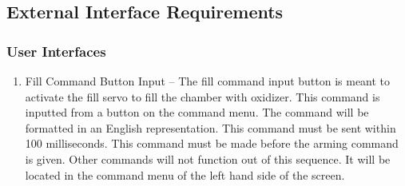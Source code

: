 \documentclass[10pt,draftclsnofoot,onecolumn,compsoc]{IEEEtran}
\begin{document}
\subsection{External Interface Requirements}
\subsubsection{ User Interfaces}
\begin{enumerate}
\item Fill Command Button Input –
The fill command input button is meant to activate the fill servo to fill the chamber with oxidizer. This command is inputted from a button on the command menu. The command will be formatted in an English representation.  This command must be sent within 100 milliseconds. This command must be made before the arming command is given. Other commands will not function out of this sequence. It will be located in the command menu of the left hand side of the screen.


\end{enumerate}
\end{document}
